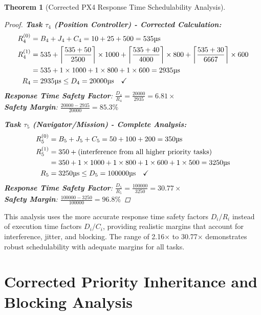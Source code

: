 \documentclass[11pt,a4paper]{article}
\newtheorem{theorem}{Theorem}[section]
\theoremstyle{definition}
\theoremstyle{remark}
\begin{document}
\begin{theorem}[Corrected PX4 Response Time Schedulability Analysis]
\begin{proof}
\textbf{Task $\tau_4$ (Position Controller) - Corrected Calculation:}
\begin{align}
R_4^{(0)} &= B_4 + J_4 + C_4 = 10 + 25 + 500 = 535\text{\textmu s} \\
R_4^{(1)} &= 535 + \left\lceil \frac{535 + 50}{2500} \right\rceil \times 1000 + \left\lceil \frac{535 + 40}{4000} \right\rceil \times 800 + \left\lceil \frac{535 + 30}{6667} \right\rceil \times 600 \\
&= 535 + 1 \times 1000 + 1 \times 800 + 1 \times 600 = 2935\text{\textmu s} \\
R_4 &= 2935\text{\textmu s} \leq D_4 = 20000\text{\textmu s} \quad \checkmark
\end{align}
\textbf{Response Time Safety Factor}: $\frac{D_4}{R_4} = \frac{20000}{2935} = 6.81\times$ \\
\textbf{Safety Margin}: $\frac{20000 - 2935}{20000} = 85.3\%$

\textbf{Task $\tau_5$ (Navigator/Mission) - Complete Analysis:}
\begin{align}
R_5^{(0)} &= B_5 + J_5 + C_5 = 50 + 100 + 200 = 350\text{\textmu s} \\
R_5^{(1)} &= 350 + \text{(interference from all higher priority tasks)} \\
&= 350 + 1 \times 1000 + 1 \times 800 + 1 \times 600 + 1 \times 500 = 3250\text{\textmu s} \\
R_5 &= 3250\text{\textmu s} \leq D_5 = 100000\text{\textmu s} \quad \checkmark
\end{align}
\textbf{Response Time Safety Factor}: $\frac{D_5}{R_5} = \frac{100000}{3250} = 30.77\times$ \\
\textbf{Safety Margin}: $\frac{100000 - 3250}{100000} = 96.8\%$

\end{proof}
\end{theorem}

This analysis uses the more accurate response time safety factors $D_i/R_i$ instead of execution time factors $D_i/C_i$, providing realistic margins that account for interference, jitter, and blocking. The range of 2.16× to 30.77× demonstrates robust schedulability with adequate margins for all tasks.

\section{Corrected Priority Inheritance and Blocking Analysis}
\end{document}
